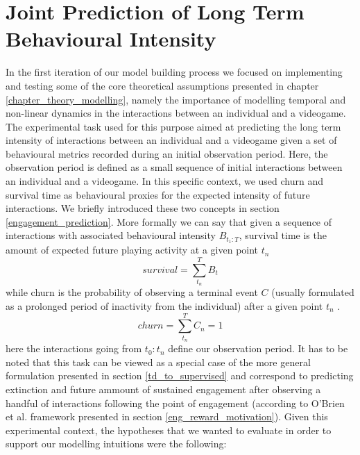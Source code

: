 \section{Joint Prediction of Long Term Behavioural Intensity}
\label{model_architecture_1}
In the first iteration of our model building process we focused on implementing and testing some of the core theoretical assumptions presented in chapter \ref{chapter_theory_modelling}, namely the importance of modelling temporal and non-linear dynamics in the interactions between an individual and a videogame. The experimental task used for this purpose aimed at predicting the long term intensity of interactions between an individual and a videogame given a set of behavioural metrics recorded during an initial observation period. Here, the observation period is defined as a small sequence of initial interactions between an individual and a videogame. In this specific context, we used churn and survival time as behavioural proxies for the expected intensity of future interactions. We briefly introduced these two concepts in section \ref{engagement_prediction}. More formally we can say that given a sequence of interactions with associated behavioural intensity $B_{t_1 : T}$, survival time is the amount of expected future playing activity at a given point $t_n$ \cite{ perianez2016churn, demediuk2018player, bertens2017games, kim2017churn, viljanen2018playtime}
\begin{equation}
\label{eq_survival}
    survival = \sum_{t_n}^{T}B_t
\end{equation}
while churn is the probability of observing a terminal event $C$ (usually formulated as a prolonged period of inactivity from the individual) after a given point $t_n$ \cite{hadiji2014predicting,runge2014churn, drachen2016rapid,milovsevic2017early, kim2017churn}.
\begin{equation}
\label{eq_churn}
    churn = \sum_{t_n}^{T}C_n = 1
\end{equation}
here the interactions going from $t_0: t_n$ define our observation period. It has to be noted that this task can be viewed as a special case of the more general formulation presented in section \ref{td_to_supervised} and correspond to predicting extinction and future ammount of sustained engagement after observing a handful of interactions following the point of engagement (according to O'Brien et al. \cite{o2008user} framework presented in section \ref{eng_reward_motivation}). Given this experimental context, the hypotheses that we wanted to evaluate in order to support our modelling intuitions were the following:
